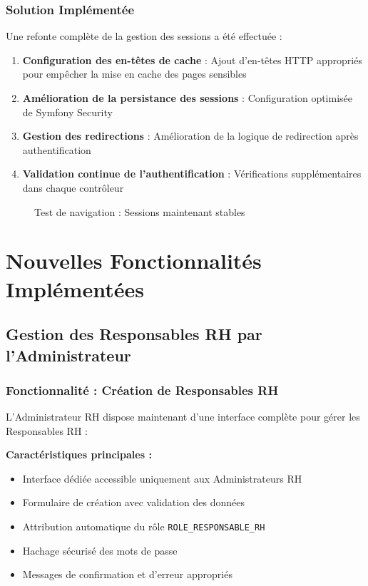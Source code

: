 \documentclass[12pt,a4paper]{article}
\begin{document}
\subsubsection{Solution Implémentée}
Une refonte complète de la gestion des sessions a été effectuée :

\begin{enumerate}
    \item \textbf{Configuration des en-têtes de cache} : Ajout d'en-têtes HTTP appropriés pour empêcher la mise en cache des pages sensibles
    \item \textbf{Amélioration de la persistance des sessions} : Configuration optimisée de Symfony Security
    \item \textbf{Gestion des redirections} : Amélioration de la logique de redirection après authentification
    \item \textbf{Validation continue de l'authentification} : Vérifications supplémentaires dans chaque contrôleur
\end{enumerate}

\begin{figure}[H]
    \centering
    \caption{Test de navigation : Sessions maintenant stables}
    \label{fig:session_problemes_resolus}
\end{figure}

\section{Nouvelles Fonctionnalités Implémentées}

\subsection{Gestion des Responsables RH par l'Administrateur}

\subsubsection{Fonctionnalité : Création de Responsables RH}
L'Administrateur RH dispose maintenant d'une interface complète pour gérer les Responsables RH :

\textbf{Caractéristiques principales :}
\begin{itemize}
    \item Interface dédiée accessible uniquement aux Administrateurs RH
    \item Formulaire de création avec validation des données
    \item Attribution automatique du rôle \texttt{ROLE\_RESPONSABLE\_RH}
    \item Hachage sécurisé des mots de passe
    \item Messages de confirmation et d'erreur appropriés
\end{itemize}
\end{document}

